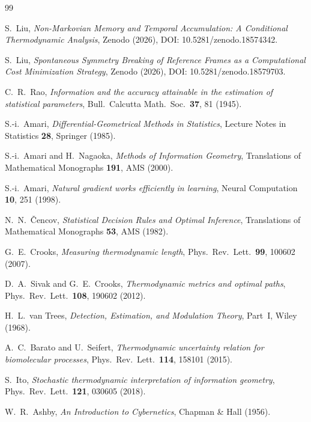 \documentclass[12pt]{article}
\begin{document}
\begin{thebibliography}{99}

S.~Liu, \emph{Non-Markovian Memory and Temporal Accumulation: A Conditional Thermodynamic Analysis}, Zenodo (2026), DOI: 10.5281/zenodo.18574342.

S.~Liu, \emph{Spontaneous Symmetry Breaking of Reference Frames as a Computational Cost Minimization Strategy}, Zenodo (2026), DOI: 10.5281/zenodo.18579703.

C.~R.~Rao,
\emph{Information and the accuracy attainable in the
estimation of statistical parameters},
Bull.\ Calcutta Math.\ Soc.\ \textbf{37}, 81 (1945).

S.-i.~Amari,
\emph{Differential-Geometrical Methods in Statistics},
Lecture Notes in Statistics \textbf{28}, Springer (1985).

S.-i.~Amari and H.~Nagaoka,
\emph{Methods of Information Geometry},
Translations of Mathematical Monographs \textbf{191},
AMS (2000).

S.-i.~Amari,
\emph{Natural gradient works efficiently in learning},
Neural Computation \textbf{10}, 251 (1998).

N.~N.~\v{C}encov,
\emph{Statistical Decision Rules and Optimal Inference},
Translations of Mathematical Monographs \textbf{53},
AMS (1982).

G.~E.~Crooks,
\emph{Measuring thermodynamic length},
Phys.\ Rev.\ Lett.\ \textbf{99}, 100602 (2007).

D.~A.~Sivak and G.~E.~Crooks,
\emph{Thermodynamic metrics and optimal paths},
Phys.\ Rev.\ Lett.\ \textbf{108}, 190602 (2012).

H.~L.~van Trees,
\emph{Detection, Estimation, and Modulation Theory},
Part~I, Wiley (1968).

A.~C.~Barato and U.~Seifert,
\emph{Thermodynamic uncertainty relation for biomolecular
processes},
Phys.\ Rev.\ Lett.\ \textbf{114}, 158101 (2015).

S.~Ito,
\emph{Stochastic thermodynamic interpretation of
information geometry},
Phys.\ Rev.\ Lett.\ \textbf{121}, 030605 (2018).

W.~R.~Ashby,
\emph{An Introduction to Cybernetics},
Chapman \& Hall (1956).


\end{thebibliography}
\end{document}
